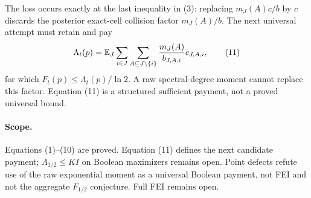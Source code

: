The loss occurs exactly at the last inequality in (3): replacing
$m_J(A)c/b$ by $c$ discards the posterior exact-cell collision factor
$m_J(A)/b$. The next universal attempt must retain and pay
\[
 \Lambda_t(p)=\mathbb E_J\sum_{i\in J}
 \sum_{A\subseteq J\setminus\{i\}}{m_J(A)\over b_{J,A,i}}c_{J,A,i},   \tag{11}
\]
for which $F_t(p)\le\Lambda_t(p)/\ln2$. A raw spectral-degree moment cannot
replace this factor. Equation (11) is a structured sufficient payment, not a
proved universal bound.

\paragraph{Scope.}
Equations (1)--(10) are proved. Equation (11) defines the next candidate
payment; $\Lambda_{1/2}\le K I$ on Boolean maximizers remains open. Point
defects refute use of the raw exponential moment as a universal Boolean
payment, not FEI and not the aggregate $F_{1/2}$ conjecture. Full FEI remains
open.
